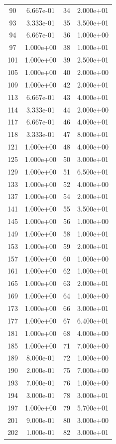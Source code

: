 \documentclass[12pt]{article}
\begin{document}
\begin{longtable}{@{}cccc@{}}
90 & 6.667e-01 & 34 & 2.000e+01 \\
93 & 3.333e-01 & 35 & 3.500e+01 \\
94 & 6.667e-01 & 36 & 1.000e+00 \\
97 & 1.000e+00 & 38 & 1.000e+01 \\
101 & 1.000e+00 & 39 & 2.500e+01 \\
105 & 1.000e+00 & 40 & 2.000e+00 \\
109 & 1.000e+00 & 42 & 2.000e+01 \\
113 & 6.667e-01 & 43 & 4.000e+01 \\
114 & 3.333e-01 & 44 & 2.000e+00 \\
117 & 6.667e-01 & 46 & 4.000e+01 \\
118 & 3.333e-01 & 47 & 8.000e+01 \\
121 & 1.000e+00 & 48 & 4.000e+00 \\
125 & 1.000e+00 & 50 & 3.000e+01 \\
129 & 1.000e+00 & 51 & 6.500e+01 \\
133 & 1.000e+00 & 52 & 4.000e+00 \\
137 & 1.000e+00 & 54 & 2.000e+01 \\
141 & 1.000e+00 & 55 & 3.500e+01 \\
145 & 1.000e+00 & 56 & 1.000e+00 \\
149 & 1.000e+00 & 58 & 1.000e+01 \\
153 & 1.000e+00 & 59 & 2.000e+01 \\
157 & 1.000e+00 & 60 & 1.000e+00 \\
161 & 1.000e+00 & 62 & 1.000e+01 \\
165 & 1.000e+00 & 63 & 2.000e+01 \\
169 & 1.000e+00 & 64 & 1.000e+00 \\
173 & 1.000e+00 & 66 & 3.000e+01 \\
177 & 1.000e+00 & 67 & 6.400e+01 \\
181 & 1.000e+00 & 68 & 4.000e+00 \\
185 & 1.000e+00 & 71 & 7.000e+00 \\
189 & 8.000e-01 & 72 & 1.000e+00 \\
190 & 2.000e-01 & 75 & 7.000e+00 \\
193 & 7.000e-01 & 76 & 1.000e+00 \\
194 & 3.000e-01 & 78 & 3.000e+01 \\
197 & 1.000e+00 & 79 & 5.700e+01 \\
201 & 9.000e-01 & 80 & 3.000e+00 \\
202 & 1.000e-01 & 82 & 3.000e+01 \\

\end{longtable}
\end{document}
